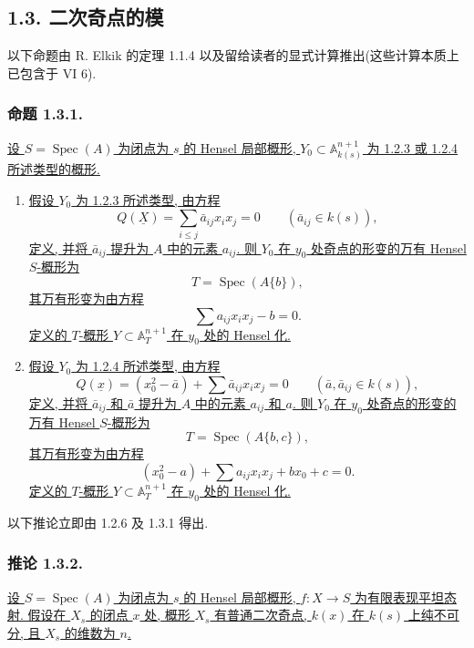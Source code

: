 \subsection*{1.3. 二次奇点的模}

以下命题由 R. Elkik 的定理 1.1.4 以及留给读者的显式计算推出(这些计算本质上已包含于 VI 6).

\subsubsection*{命题 1.3.1.}
\underline{设 $S=\operatorname{Spec}(A)$ 为闭点为 $s$ 的 Hensel 局部概形, $Y_0\subset\mathbb A_{k(s)}^{n+1}$ 为 1.2.3 或 1.2.4 所述类型的概形.}

\begin{enumerate}[label=(\roman*),leftmargin=2.6em]
\item \underline{假设 $Y_0$ 为 1.2.3 所述类型, 由方程}
\[
Q(\underline X)=\sum_{i\leq j}\bar a_{ij}x_i x_j=0
\qquad(\bar a_{ij}\in k(s)),
\]
\underline{定义, 并将 $\bar a_{ij}$ 提升为 $A$ 中的元素 $a_{ij}$. 则 $Y_0$ 在 $y_0$ 处奇点的形变的万有 Hensel $S$-概形为}
\[
T=\operatorname{Spec}(A\{b\}),
\]
\underline{其万有形变为由方程}
\[
\sum a_{ij}x_i x_j-b=0.
\]
\underline{定义的 $T$-概形 $Y\subset\mathbb A_T^{n+1}$ 在 $y_0$ 处的 Hensel 化.}

\item \underline{假设 $Y_0$ 为 1.2.4 所述类型, 由方程}
\[
Q(\underline x)=(x_0^2-\bar a)+\sum\bar a_{ij}x_i x_j=0
\qquad(\bar a,\bar a_{ij}\in k(s)),
\]
\underline{定义, 并将 $\bar a_{ij}$ 和 $\bar a$ 提升为 $A$ 中的元素 $a_{ij}$ 和 $a$. 则 $Y_0$ 在 $y_0$ 处奇点的形变的万有 Hensel $S$-概形为}
\[
T=\operatorname{Spec}(A\{b,c\}),
\]
\underline{其万有形变为由方程}
\[
(x_0^2-a)+\sum a_{ij}x_i x_j+b x_0+c=0.
\]
\underline{定义的 $T$-概形 $Y\subset\mathbb A_T^{n+1}$ 在 $y_0$ 处的 Hensel 化.}
\end{enumerate}

以下推论立即由 1.2.6 及 1.3.1 得出.

\subsubsection*{推论 1.3.2.}
\underline{设 $S=\operatorname{Spec}(A)$ 为闭点为 $s$ 的 Hensel 局部概形, $f:X\to S$ 为有限表现平坦态射. 假设在 $X_s$ 的闭点 $x$ 处, 概形 $X_s$ 有普通二次奇点, $k(x)$ 在 $k(s)$ 上纯不可分, 且 $X_s$ 的维数为 $n$.}

